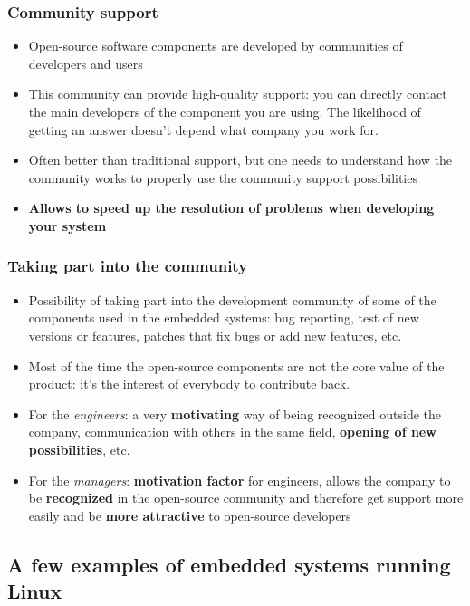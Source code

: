 \begin{frame}
  \frametitle{Community support}
  \begin{itemize}
  \item Open-source software components are developed by communities
    of developers and users
  \item This community can provide high-quality support: you can
    directly contact the main developers of the component you are
    using. The likelihood of getting an answer doesn't depend what
    company you work for.
  \item Often better than traditional support, but one needs to
    understand how the community works to properly use the community
    support possibilities
  \item {\bf Allows to speed up the resolution of problems when
      developing your system}
  \end{itemize}
\end{frame}

\begin{frame}
  \frametitle{Taking part into the community}
  \begin{itemize}
  \item Possibility of taking part into the development community of
    some of the components used in the embedded systems: bug
    reporting, test of new versions or features, patches that fix bugs
    or add new features, etc.
  \item Most of the time the open-source components are not the core
    value of the product: it’s the interest of everybody to contribute
    back.
  \item For the {\em engineers}: a very {\bf motivating} way of being
    recognized outside the company, communication with others in the
    same field, {\bf opening of new possibilities}, etc.
  \item For the {\em managers}: {\bf motivation factor} for engineers,
    allows the company to be {\bf recognized} in the open-source
    community and therefore get support more easily and be {\bf more
      attractive} to open-source developers
\end{itemize}
\end{frame}

\subsection[Systems running Linux]{A few examples of embedded systems
  running Linux}

